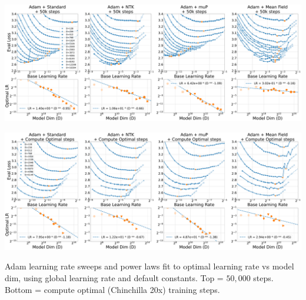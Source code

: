 \documentclass{article}
\theoremstyle{plain}
\theoremstyle{definition}
\theoremstyle{remark}
\begin{document}
\thispagestyle{plain}
\begin{SidewaysFigure}
\\
\includegraphics[width=0.98\linewidth]{icml2024/figures/lr_sweeps/compute_opt_appendix/adam+50k_steps.pdf}

\figvspace

\includegraphics[width=0.98\linewidth]{icml2024/figures/lr_sweeps/compute_opt_appendix/adam+compute_opt.pdf}
\caption{Adam learning rate sweeps and power laws fit to optimal learning rate vs model dim, using global learning rate and default constants. Top = $50{,}000$ steps. Bottom = compute optimal (Chinchilla 20x) training steps.}
\label{fig:app_compute_opt_adam}
\end{SidewaysFigure}
\clearpage
\end{document}
